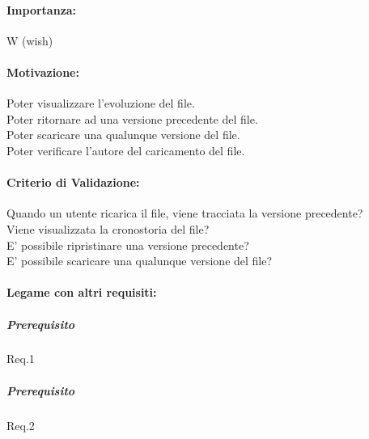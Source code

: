 \paragraph{Importanza:}
	W (wish)
\paragraph{Motivazione:}
	Poter visualizzare l'evoluzione del file.\\
	Poter ritornare ad una versione precedente del file.\\
	Poter scaricare una qualunque versione del file.\\
	Poter verificare l'autore del caricamento del file.
\paragraph{Criterio di Validazione:}
	Quando un utente ricarica il file, viene tracciata la versione precedente?\\
	Viene visualizzata la cronostoria del file?\\
	E' possibile ripristinare una versione precedente?\\
	E' possibile scaricare una qualunque versione del file?
\paragraph{Legame con altri requisiti:}
	\subparagraph{Prerequisito} Req.1
	\subparagraph{Prerequisito} Req.2